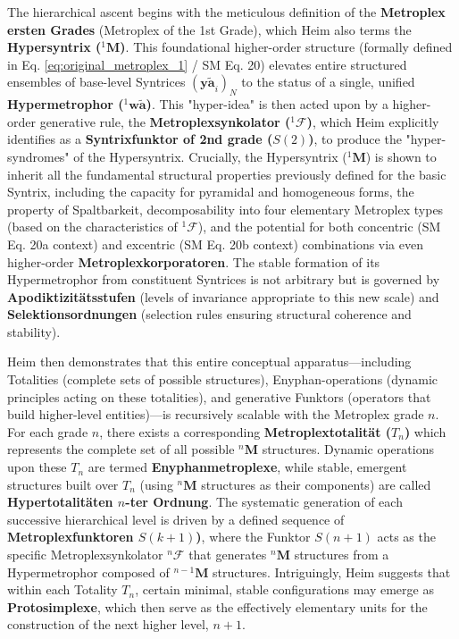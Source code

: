 \documentclass[12pt]{article}
\newcommand{\syntrix}{\bm{y\widetilde{a}}}
\newcommand{\metroplex}[1]{{}^{#1}\mathbf{M}}
\newcommand{\hypersyntrix}{\metroplex{1}}
\newcommand{\hypermetrophor}[1]{{}^{#1}\mathbf{w\widetilde{a}}}
\newcommand{\metroplexsynkolator}[1]{{}^{#1}\mathcal{F}}
\newcommand{\metroplextotalitaet}[1]{T_{#1}}
\newcommand{\metroplexfunktor}{S}
\begin{document}
The hierarchical ascent begins with the meticulous definition of the \textbf{Metroplex ersten Grades} (Metroplex of the 1st Grade), which Heim also terms the \textbf{Hypersyntrix (\(\hypersyntrix\))}. This foundational higher-order structure (formally defined in Eq. \eqref{eq:original_metroplex_1} / SM Eq. 20) elevates entire structured ensembles of base-level Syntrices \( (\syntrix_i)_N \) to the status of a single, unified \textbf{Hypermetrophor (\(\hypermetrophor{1}\))}. This "hyper-idea" is then acted upon by a higher-order generative rule, the \textbf{Metroplexsynkolator (\(\metroplexsynkolator{1}\))}, which Heim explicitly identifies as a \textbf{Syntrixfunktor of 2nd grade (\(\metroplexfunktor(2)\))}, to produce the "hyper-syndromes" of the Hypersyntrix. Crucially, the Hypersyntrix (\(\hypersyntrix\)) is shown to inherit all the fundamental structural properties previously defined for the basic Syntrix, including the capacity for pyramidal and homogeneous forms, the property of Spaltbarkeit, decomposability into four elementary Metroplex types (based on the characteristics of \( \metroplexsynkolator{1} \)), and the potential for both concentric (SM Eq. 20a context) and excentric (SM Eq. 20b context) combinations via even higher-order \textbf{Metroplexkorporatoren}. The stable formation of its Hypermetrophor from constituent Syntrices is not arbitrary but is governed by \textbf{Apodiktizitätsstufen} (levels of invariance appropriate to this new scale) and \textbf{Selektionsordnungen} (selection rules ensuring structural coherence and stability).

Heim then demonstrates that this entire conceptual apparatus—including Totalities (complete sets of possible structures), Enyphan-operations (dynamic principles acting on these totalities), and generative Funktors (operators that build higher-level entities)—is recursively scalable with the Metroplex grade \( n \). For each grade \( n \), there exists a corresponding \textbf{Metroplextotalität (\( \metroplextotalitaet{n} \))} which represents the complete set of all possible \( \metroplex{n} \) structures. Dynamic operations upon these \( \metroplextotalitaet{n} \) are termed \textbf{Enyphanmetroplexe}, while stable, emergent structures built over \( \metroplextotalitaet{n} \) (using \( \metroplex{n} \) structures as their components) are called \textbf{Hypertotalitäten \( n \)-ter Ordnung}. The systematic generation of each successive hierarchical level is driven by a defined sequence of \textbf{Metroplexfunktoren \( \metroplexfunktor(k+1) \))}, where the Funktor \( \metroplexfunktor(n+1) \) acts as the specific Metroplexsynkolator \( \metroplexsynkolator{n} \) that generates \( \metroplex{n} \) structures from a Hypermetrophor composed of \( \metroplex{n-1} \) structures. Intriguingly, Heim suggests that within each Totality \( \metroplextotalitaet{n} \), certain minimal, stable configurations may emerge as \textbf{Protosimplexe}, which then serve as the effectively elementary units for the construction of the next higher level, \(n+1\).
\end{document}
